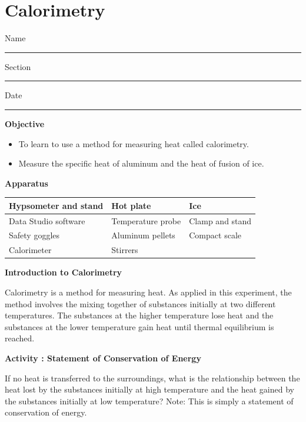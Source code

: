 \setcounter{equation}{0}
\setcounter{figure}{0}

\section{Calorimetry}

Name \rule{2.0in}{0.1pt}\hfill{}Section \rule{1.0in}{0.1pt}\hfill{}Date
\rule{1.0in}{0.1pt}

\textbf{Objective}

\begin{itemize}

\item To learn to use a method for measuring heat called calorimetry.

\item Measure the specific heat of aluminum and the heat of fusion of ice.

\end{itemize}

\textbf{Apparatus}

\begin{center}
\begin{tabular}{|l|l|l|} \hline
Hypsometer and stand & Hot plate            & Ice \\ \hline
Data Studio software & Temperature probe    & Clamp and stand \\ \hline
Safety goggles       & Aluminum pellets     & Compact scale           \\ \hline
Calorimeter          & Stirrers             &            \\ \hline
\end{tabular}
\end{center}

\textbf{Introduction to Calorimetry} 

Calorimetry is a method for measuring heat. As applied in this experiment,
the method involves the mixing together of substances initially at
two different temperatures. The substances at the higher temperature
lose heat and the substances at the lower temperature gain heat until
thermal equilibrium is reached.

\textbf{Activity : Statement of Conservation of Energy}

If no heat is transferred to the surroundings, what is the relationship
between the heat lost by the substances initially at high temperature
and the heat gained by the substances initially at low temperature?
Note: This is simply a statement of conservation of energy.

